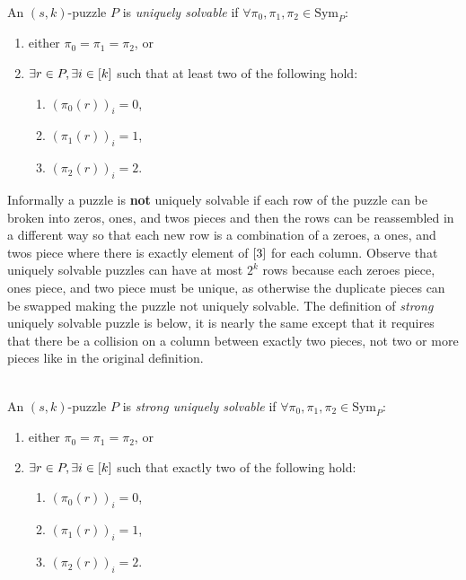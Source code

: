 \documentclass[11pt]{article}
\newcommand\Sym[1]{\ensuremath{\mathrm{Sym}_{#1}}}
\begin{document}
\begin{definition}
  ~\\An $(s,k)$-puzzle $P$ is \emph{uniquely solvable} if
  $\forall \pi_0, \pi_1, \pi_2 \in \Sym{P}:$
  \begin{enumerate}
  \item either $\pi_0 = \pi_1 = \pi_2$, or
  \item $\exists r \in P, \exists i \in [k]$ such that at least two
    of the following hold:
    \begin{enumerate}
    \item $(\pi_0(r))_i = 0$,
    \item $(\pi_1(r))_i = 1$,
    \item $(\pi_2(r))_i = 2$.
    \end{enumerate}
  \end{enumerate}
\end{definition}

Informally a puzzle is \textbf{not} uniquely solvable if each row of
the puzzle can be broken into zeros, ones, and twos pieces and then
the rows can be reassembled in a different way so that each new row is
a combination of a zeroes, a ones, and twos piece where there is
exactly element of $[3]$ for each column.  Observe that uniquely
solvable puzzles can have at most $2^k$ rows because each zeroes
piece, ones piece, and two piece must be unique, as otherwise the
duplicate pieces can be swapped making the puzzle not uniquely
solvable.  The definition of \emph{strong} uniquely solvable puzzle is
below, it is nearly the same except that it requires that there be a
collision on a column between exactly two pieces, not two or more
pieces like in the original definition.

\begin{definition}
  ~\\
  An $(s,k)$-puzzle $P$ is \emph{strong uniquely solvable} if
  $\forall \pi_0, \pi_1, \pi_2 \in \Sym{P}:$
  \begin{enumerate}
  \item either $\pi_0 = \pi_1 = \pi_2$, or
  \item $\exists r \in P, \exists i \in [k]$ such that exactly two
    of the following hold:
    \begin{enumerate}
    \item $(\pi_0(r))_i = 0$,
    \item $(\pi_1(r))_i = 1$,
    \item $(\pi_2(r))_i = 2$.
    \end{enumerate}
  \end{enumerate}
  
\end{definition}
\end{document}
